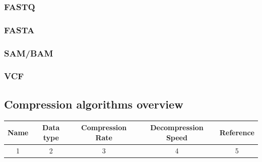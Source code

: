 \subsubsection{FASTQ}

\subsubsection{FASTA}

\subsubsection{SAM/BAM}

\subsubsection{VCF}



\subsection{Compression algorithms overview}






\begin{center}
    \begin{tabular}{|| c | c | c | c | c ||}
        \hline
        Name & Data type & Compression Rate & Decompression Speed & Reference \\
        \hline\hline
        1 & 2 & 3 & 4 & 5\\
        \hline
    \end{tabular}
\end{center}









